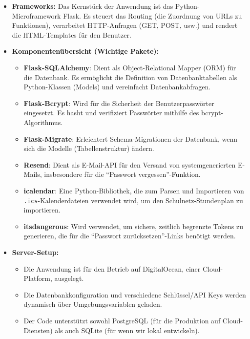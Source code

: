 \documentclass[12pt,a4paper]{report}
\begin{document}
\begin{itemize}
    \item \textbf{Frameworks:}
    Das Kernstück der Anwendung ist das Python-Microframework Flask. Es steuert das Routing (die Zuordnung von URLs zu Funktionen), verarbeitet HTTP-Anfragen (GET, POST, usw.) und rendert die HTML-Templates für den Benutzer.

    \item \textbf{Komponentenübersicht (Wichtige Pakete):}
    \begin{itemize}
        \item \textbf{Flask-SQLAlchemy}: Dient als Object-Relational Mapper (ORM) für die Datenbank. Es ermöglicht die Definition von Datenbanktabellen als Python-Klassen (Models) und vereinfacht Datenbankabfragen.
        \item \textbf{Flask-Bcrypt}: Wird für die Sicherheit der Benutzerpasswörter eingesetzt. Es hasht und verifiziert Passwörter mithilfe des bcrypt-Algorithmus.
        \item \textbf{Flask-Migrate}: Erleichtert Schema-Migrationen der Datenbank, wenn sich die Modelle (Tabellenstruktur) ändern.
        \item \textbf{Resend}: Dient als E-Mail-API für den Versand von systemgenerierten E-Mails, insbesondere für die \enquote{Passwort vergessen}-Funktion.
        \item \textbf{icalendar}: Eine Python-Bibliothek, die zum Parsen und Importieren von \texttt{.ics}-Kalenderdateien verwendet wird, um den Schulnetz-Stundenplan zu importieren.
        \item \textbf{itsdangerous}: Wird verwendet, um sichere, zeitlich begrenzte Tokens zu generieren, die für die \enquote{Passwort zurücksetzen}-Links benötigt werden.
    \end{itemize}

    \item \textbf{Server-Setup:}
    \begin{itemize}
        \item Die Anwendung ist für den Betrieb auf DigitalOcean, einer Cloud-Platform, ausgelegt.
        \item Die Datenbankkonfiguration und verschiedene Schlüssel/API Keys werden dynamisch über Umgebungsvariablen geladen.
        \item Der Code unterstützt sowohl PostgreSQL (für die Produktion auf Cloud-Diensten) als auch SQLite (für wenn wir lokal entwickeln).
    \end{itemize}
\end{itemize}
\end{document}

